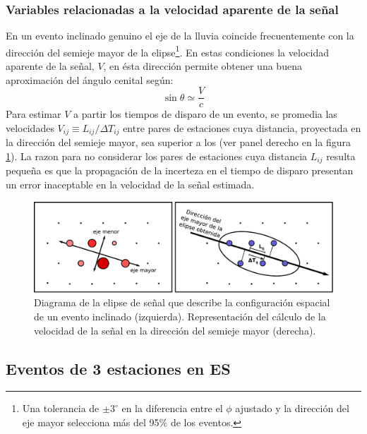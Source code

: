 		\subsubsection{Variables relacionadas a la velocidad aparente de la señal}
		En un evento inclinado genuino el eje de la lluvia coincide frecuentemente con la dirección del semieje mayor de la elipse\footnote{Una tolerancia de $\pm3^\circ$ en la diferencia entre el $\phi$ ajustado y la direcci\'on del eje mayor selecciona m\'as del 95$\%$ de los eventos.}.
		En estas condiciones la velocidad aparente de la señal, $V$, en ésta dirección permite obtener una buena aproximación del ángulo cenital seg\'un:
		\begin{equation}
		\sin\theta \simeq \frac{V}{c}
		\end{equation}
		Para estimar $V$ a partir los tiempos de disparo de un evento, se promedia las velocidades $V_{ij}\equiv L_{ij}/\Delta T_{ij}$ entre pares de estaciones cuya distancia, proyectada en la dirección del semieje mayor, sea superior a los  (ver panel derecho en la figura \ref{fig:elipse}).
		La razon para no considerar los pares de estaciones cuya distancia $L_{ij}$ resulta peque\~na es que la propagación de la incerteza en el tiempo de disparo presentan un error inaceptable en la velocidad de la señal estimada.
		\begin{figure}[ht]
		\begin{center}
		\includegraphics[width=1.0\textwidth]{fig/seleccionAuger/elipse.pdf}
		\caption{Diagrama de la elipse de señal que describe la configuración espacial de un evento inclinado (izquierda). Representación del cálculo de la velocidad de la señal en la dirección del semieje mayor (derecha).}
		\label{fig:elipse}
		\end{center}
		\end{figure}
		
		\subsection{Eventos de 3 estaciones en ES}
		\label{sbsc:3StIncl}
		
